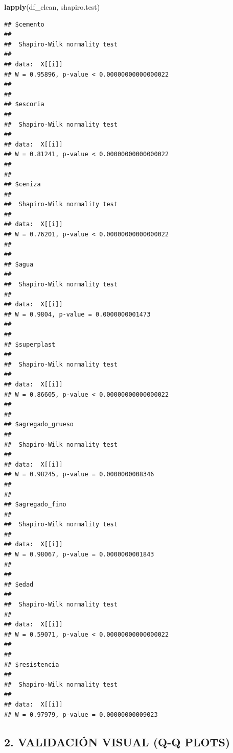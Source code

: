 \documentclass[
]{book}
\newenvironment{Shaded}{\begin{snugshade}}{\end{snugshade}}
\newcommand{\AttributeTok}[1]{\textcolor[rgb]{0.13,0.29,0.53}{#1}}
\newcommand{\CommentTok}[1]{\textcolor[rgb]{0.56,0.35,0.01}{\textit{#1}}}
\newcommand{\ConstantTok}[1]{\textcolor[rgb]{0.56,0.35,0.01}{#1}}
\newcommand{\DecValTok}[1]{\textcolor[rgb]{0.00,0.00,0.81}{#1}}
\newcommand{\FunctionTok}[1]{\textcolor[rgb]{0.13,0.29,0.53}{\textbf{#1}}}
\newcommand{\NormalTok}[1]{#1}
\newcommand{\SpecialCharTok}[1]{\textcolor[rgb]{0.81,0.36,0.00}{\textbf{#1}}}
\newcommand{\StringTok}[1]{\textcolor[rgb]{0.31,0.60,0.02}{#1}}
\begin{document}
\begin{Shaded}
\begin{Highlighting}[]
\FunctionTok{lapply}\NormalTok{(df\_clean, shapiro.test)}
\end{Highlighting}
\end{Shaded}

\begin{verbatim}
## $cemento
## 
##  Shapiro-Wilk normality test
## 
## data:  X[[i]]
## W = 0.95896, p-value < 0.00000000000000022
## 
## 
## $escoria
## 
##  Shapiro-Wilk normality test
## 
## data:  X[[i]]
## W = 0.81241, p-value < 0.00000000000000022
## 
## 
## $ceniza
## 
##  Shapiro-Wilk normality test
## 
## data:  X[[i]]
## W = 0.76201, p-value < 0.00000000000000022
## 
## 
## $agua
## 
##  Shapiro-Wilk normality test
## 
## data:  X[[i]]
## W = 0.9804, p-value = 0.0000000001473
## 
## 
## $superplast
## 
##  Shapiro-Wilk normality test
## 
## data:  X[[i]]
## W = 0.86605, p-value < 0.00000000000000022
## 
## 
## $agregado_grueso
## 
##  Shapiro-Wilk normality test
## 
## data:  X[[i]]
## W = 0.98245, p-value = 0.0000000008346
## 
## 
## $agregado_fino
## 
##  Shapiro-Wilk normality test
## 
## data:  X[[i]]
## W = 0.98067, p-value = 0.0000000001843
## 
## 
## $edad
## 
##  Shapiro-Wilk normality test
## 
## data:  X[[i]]
## W = 0.59071, p-value < 0.00000000000000022
## 
## 
## $resistencia
## 
##  Shapiro-Wilk normality test
## 
## data:  X[[i]]
## W = 0.97979, p-value = 0.00000000009023
\end{verbatim}

\subsection{2. VALIDACIÓN VISUAL (Q-Q PLOTS)}\label{validaciuxf3n-visual-q-q-plots}

\begin{Shaded}
\end{Shaded}
\end{document}
